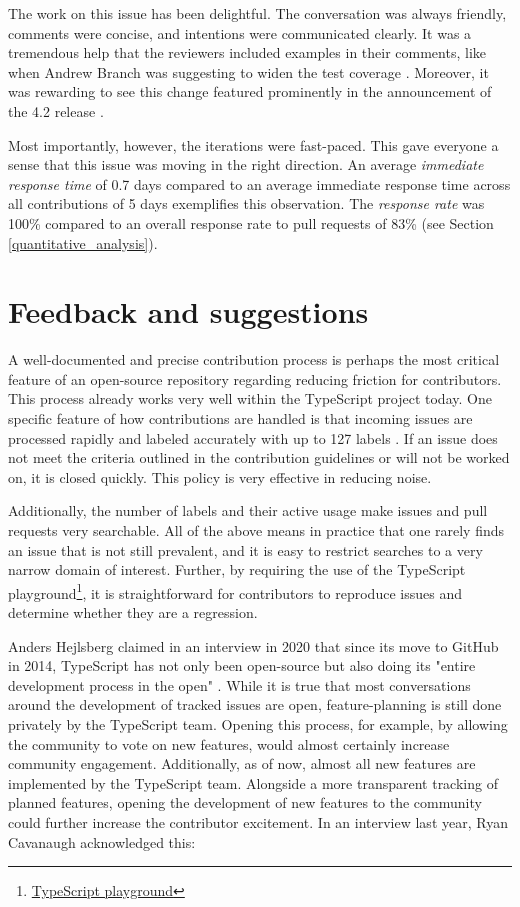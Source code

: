 \documentclass[12pt]{scrartcl}
\begin{document}
The work on this issue has been delightful. The conversation was always friendly, comments were concise, and intentions were communicated clearly. It was a tremendous help that the reviewers included examples in their comments, like when Andrew Branch was suggesting to widen the test coverage \cite{41928Comment4}. Moreover, it was rewarding to see this change featured prominently in the announcement of the 4.2 release \cite{TypeScript4.2Changelog}.

Most importantly, however, the iterations were fast-paced. This gave everyone a sense that this issue was moving in the right direction. An average \textit{immediate response time} of 0.7 days compared to an average immediate response time across all contributions of 5 days exemplifies this observation. The \textit{response rate} was 100\% compared to an overall response rate to pull requests of 83\% (see Section \ref{quantitative_analysis}).

\section{Feedback and suggestions}
\label{feedback}

A well-documented and precise contribution process is perhaps the most critical feature of an open-source repository regarding reducing friction for contributors. This process already works very well within the TypeScript project today. One specific feature of how contributions are handled is that incoming issues are processed rapidly and labeled accurately with up to 127 labels \cite{TypeScriptLabels}. If an issue does not meet the criteria outlined in the contribution guidelines or will not be worked on, it is closed quickly. This policy is very effective in reducing noise.

Additionally, the number of labels and their active usage make issues and pull requests very searchable. All of the above means in practice that one rarely finds an issue that is not still prevalent, and it is easy to restrict searches to a very narrow domain of interest. Further, by requiring the use of the TypeScript playground\footnote{\href{https://www.typescriptlang.org/play}{TypeScript playground}}, it is straightforward for contributors to reproduce issues and determine whether they are a regression.

Anders Hejlsberg claimed in an interview in 2020 that since its move to GitHub in 2014, TypeScript has not only been open-source but also doing its "entire development process in the open" \cite{Tung2020}. While it is true that most conversations around the development of tracked issues are open, feature-planning is still done privately by the TypeScript team. Opening this process, for example, by allowing the community to vote on new features, would almost certainly increase community engagement. Additionally, as of now, almost all new features are implemented by the TypeScript team. Alongside a more transparent tracking of planned features, opening the development of new features to the community could further increase the contributor excitement. In an interview last year, Ryan Cavanaugh acknowledged this:
\end{document}
